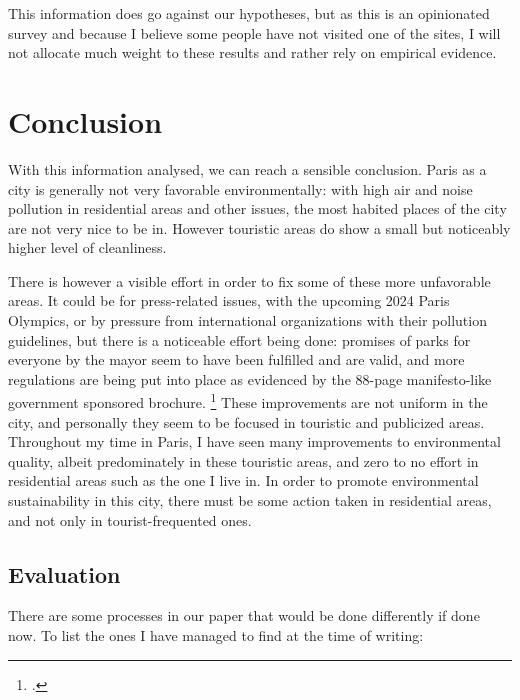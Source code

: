 \documentclass[11pt,letterpaper]{article}
\begin{document}
This information does go against our hypotheses, but as this is an opinionated survey and because I believe some people have not visited one of the sites, I will not allocate much weight to these results and rather rely on empirical evidence.

\section{Conclusion}
\label{sec:conclusion}

With this information analysed, we can reach a sensible conclusion. Paris as a city is generally not very favorable environmentally: with high air and noise pollution in residential areas and other issues, the most habited places of the city are not very nice to be in. However touristic areas do show a small but noticeably higher level of cleanliness.

There is however a visible effort in order to fix some of these more unfavorable areas. It could be for press-related issues, with the upcoming 2024 Paris Olympics, or by pressure from international organizations with their pollution guidelines, but there is a noticeable effort being done: promises of parks for everyone by the mayor seem to have been fulfilled and are valid, and more regulations are being put into place as evidenced by the 88-page manifesto-like government sponsored brochure. \footcite{bruitparif} These improvements are not uniform in the city, and personally they seem to be focused in touristic and publicized areas. Throughout my time in Paris, I have seen many improvements to environmental quality, albeit predominately in these touristic areas, and zero to no effort in residential areas such as the one I live in. In order to promote environmental sustainability in this city, there must be some action taken in residential areas, and not only in tourist-frequented ones. 


\subsection{Evaluation}

There are some processes in our paper that would be done differently if done now. To list the ones I have managed to find at the time of writing:
\end{document}
